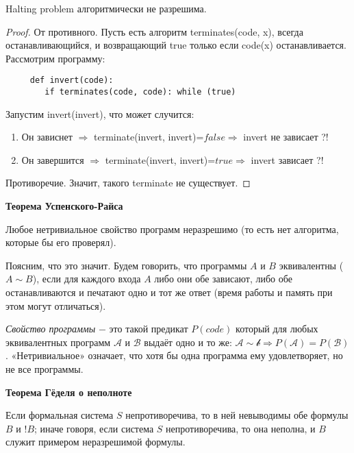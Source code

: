 \begin{theorem}
    Halting problem алгоритмически не разрешима.
\end{theorem}

\begin{proof}
    От противного. Пусть есть алгоритм terminates(code, x), всегда останавливающийся, и возвращающий true только если code(x) останавливается. Рассмотрим программу:

    \begin{lstlisting}
     def invert(code):
        if terminates(code, code): while (true)
    \end{lstlisting}

    Запустим invert(invert), что может случится:
    \begin{enumerate}
        \item Он зависнет $\Rightarrow $ terminate(invert, invert)=$false\Rightarrow$ invert не зависает ?!
        \item Он завершится $\Rightarrow $ terminate(invert, invert)=$true\Rightarrow$ invert зависает ?!
    \end{enumerate}
    Противоречие. Значит, такого terminate не существует.
\end{proof}

\begin{theorem}
    \textbf{Теорема Успенского-Райса}

    Любое нетривиальное свойство программ неразрешимо (то есть нет алгоритма, которые бы его проверял).
\end{theorem}

Поясним, что это значит. Будем говорить, что программы $A$ и $B$ эквивалентны ($A\sim B$), если для каждого входа $A$ либо они обе зависают, либо обе останавливаются и печатают одно и тот же ответ (время работы и память при этом могут отличаться).

\begin{definition}
    \textit{Свойство программы} $-$ это такой предикат $P(code)$ который для любых эквивалентных программ $\mathcal{A}$ и $\mathcal{B}$ выдаёт одно и то же: $\mathcal{A}\sim \mathcal{b}\Rightarrow P(\mathcal{A})= P(\mathcal{B})$. «Нетривиальное» означает, что хотя бы одна программа ему удовлетворяет, но не все программы.
\end{definition}

\begin{theorem}
    \textbf{Теорема Гёделя о неполноте}

    Если формальная система $S$ непротиворечива, то в ней невыводимы обе формулы $B$ и $!B$; иначе говоря, если система $S$ непротиворечива, то она неполна, и $B$ служит примером неразрешимой формулы.
\end{theorem}

